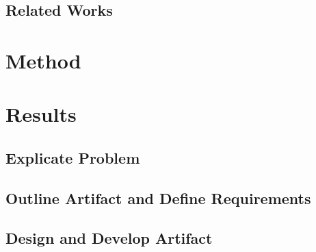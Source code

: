 \documentclass[12pt,
               a4,
               twoside,
               openright]{book} %
\begin{document}
    \section{Related Works}
    \label{sec:related}
        
    
    \chapter{Method}
    \label{chap:method}
    
    
    
    \chapter{Results}
    \label{chap:results}  
    
    \section{Explicate Problem}    
    \label{sec:problem}


    
    
    
    \section{Outline Artifact and Define Requirements}
    \label{sec:outline}
    
    \section{Design and Develop Artifact}
    \label{sec:design}
    
\end{document}

